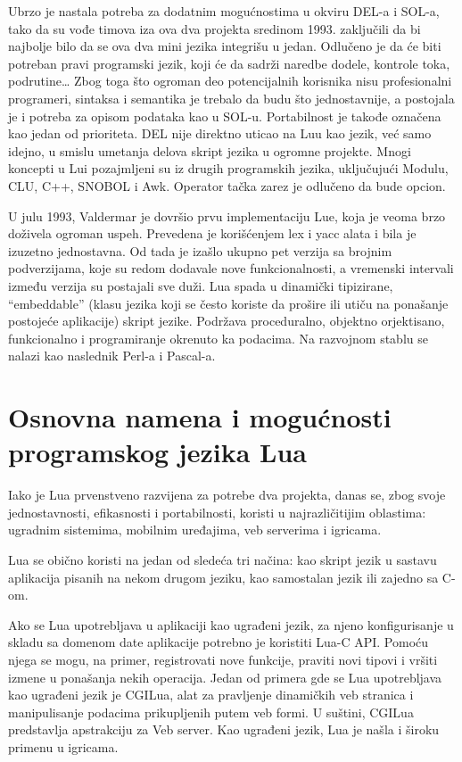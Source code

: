 \documentclass[a4paper]{article}
\begin{document}
Ubrzo je nastala potreba za dodatnim mogućnostima u okviru DEL-a i SOL-a, tako da su vođe timova iza ova dva projekta sredinom 1993. zaključili da bi najbolje bilo da se ova dva mini jezika integrišu u jedan. Odlučeno je da će biti potreban pravi programski jezik, koji će da sadrži naredbe dodele, kontrole toka, podrutine… Zbog toga što ogroman deo potencijalnih korisnika nisu profesionalni programeri, sintaksa i semantika je trebalo da budu što jednostavnije, a postojala je i potreba za opisom podataka kao u SOL-u. Portabilnost je takođe označena kao jedan od prioriteta. DEL nije direktno uticao na Luu kao jezik, već samo idejno, u smislu umetanja delova skript jezika u ogromne projekte. Mnogi koncepti u Lui pozajmljeni su iz drugih programskih jezika, uključujući Modulu, CLU, C++, SNOBOL i Awk. Operator tačka zarez je odlučeno da bude opcion. 

U julu 1993, Valdermar je dovršio prvu implementaciju Lue, koja je veoma brzo doživela ogroman uspeh. Prevedena je korišćenjem lex i yacc alata i bila je izuzetno jednostavna. Od tada je izašlo ukupno pet verzija sa brojnim podverzijama, koje su redom dodavale nove funkcionalnosti, a vremenski intervali između verzija su postajali sve duži. 
Lua spada u dinamički tipizirane, “embeddable” (klasu jezika koji se često koriste da prošire ili utiču na ponašanje postojeće aplikacije) skript jezike. Podržava proceduralno, objektno orjektisano, funkcionalno i programiranje okrenuto ka podacima. Na razvojnom stablu se nalazi kao naslednik Perl-a i Pascal-a. \cite{evolution}




\section{Osnovna namena i mogućnosti programskog jezika Lua}	
\label{sec:namena_i_mogucnosti}

Iako je Lua prvenstveno razvijena za potrebe dva projekta, danas se, zbog svoje jednostavnosti, efikasnosti i portabilnosti, koristi u najrazličitijim oblastima: ugradnim sistemima, mobilnim uređajima, veb serverima i igricama.

Lua se obično koristi na jedan od sledeća tri načina: kao skript jezik u sastavu aplikacija pisanih na nekom drugom jeziku, kao samostalan jezik ili zajedno sa C-om\cite{bookProgInLua}. 

Ako se Lua upotrebljava u aplikaciji kao ugrađeni jezik, za njeno konfigurisanje u skladu sa domenom date aplikacije potrebno je koristiti Lua-C API. Pomoću njega se mogu, na primer, registrovati nove funkcije, praviti novi tipovi i vršiti izmene u ponašanja nekih operacija. Jedan od primera gde se Lua upotrebljava kao ugrađeni jezik je CGILua, alat za pravljenje dinamičkih veb stranica i manipulisanje podacima prikupljenih putem veb formi. U suštini, CGILua predstavlja apstrakciju za Veb server\cite{keplerProject}. Kao ugrađeni jezik, Lua je našla i široku primenu u igricama.
\end{document}
